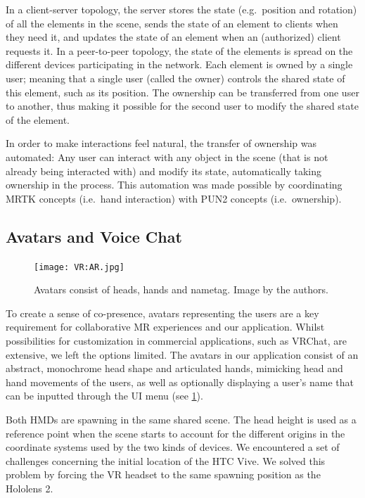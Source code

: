 \documentclass[10pt,twocolumn,letterpaper,english]{article}
\begin{document}
In a client-server topology, the server stores the state (e.g.\ position and rotation) of all the elements in the scene, sends the state of an element to clients when they need it, and updates the state of an element when an (authorized) client requests it. In a peer-to-peer topology, the state of the elements is spread on the different devices participating in the network. Each element is owned by a single user; meaning that a single user (called the owner) controls the shared state of this element, such as its position. The ownership can be transferred from one user to another, thus making it possible for the second user to modify the shared state of the element.

In order to make interactions feel natural, the transfer of ownership was automated: Any user can interact with any object in the scene (that is not already being interacted with) and modify its state, automatically taking ownership in the process. This automation was made possible by coordinating MRTK concepts (i.e.\ hand interaction) with PUN2 concepts (i.e.\ ownership).

\subsection{Avatars and Voice Chat}

\begin{figure}[!htp]
    \centering
    \texttt{[image: VR:AR.jpg]}
    \caption{Avatars consist of heads, hands and nametag. Image by the authors.}
    \label{fig:Vr Avatar}
\end{figure}

To create a sense of co-presence, avatars representing the users are a key requirement for collaborative MR experiences and our application. Whilst possibilities for customization in commercial applications, such as VRChat, are extensive, we left the options limited. The avatars in our application consist of an abstract, monochrome head shape and articulated hands, mimicking head and hand movements of the users, as well as optionally displaying a user's name that can be inputted through the UI menu (see \cref{fig:Vr Avatar}). 

Both HMDs are spawning in the same shared scene. The head height is used as a reference point when the scene starts to account for the different origins in the coordinate systems used by the two kinds of devices. We encountered a set of challenges concerning the initial location of the HTC Vive. We solved this problem by forcing the VR headset to the same spawning position as the Hololens 2.
\end{document}

